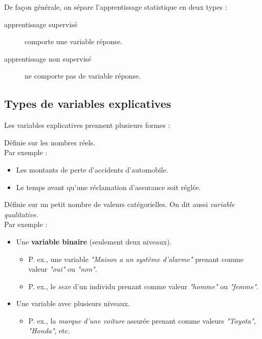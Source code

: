 \documentclass[10pt, french]{article}
\begin{document}
\begin{multicols*}{2}
De façon générale, on sépare l'apprentissage statistique en deux types :
\begin{description}
	\item[apprentissage supervisé]	comporte une variable réponse.
	\item[apprentissage non supervisé]	ne comporte pas de variable réponse.
\end{description}


\columnbreak
\subsection{Types de variables explicatives}
Les variables explicatives prennent plusieurs formes :

\begin{definitionNOHFILLpropos}
Définie sur les nombres réels.	\\

Par exemple :
\begin{itemize}
	\item	Les montants de perte d'accidents d'automobile.
	\item	Le temps avant qu'une réclamation d'assurance soit réglée.
\end{itemize}
\end{definitionNOHFILLpropos}

\begin{definitionNOHFILLpropos}
Définie sur un petit nombre de valeurs catégorielles. On dit aussi \textit{variable qualitative}.	\\

Par exemple : 
\begin{itemize}
	\item	Une \textbf{variable binaire} (seulement deux niveaux). 
		\begin{itemize}
		\item	P. ex., une variable \textit{"Maison a un système d'alarme"} prenant comme valeur \textit{"oui"} ou \textit{"non"}.
		\item	P. ex., le \textit{sexe} d'un individu prenant comme valeur \textit{"homme"} ou \textit{"femme"}.
		\end{itemize}
	\item	Une variable avec plusieurs niveaux.
		\begin{itemize}
		\item	P. ex., la \textit{marque d'une voiture} assurée prenant comme valeurs \textit{"Toyota"}, \textit{"Honda"}, etc.
		\end{itemize}
\end{itemize}


\end{definitionNOHFILLpropos}
\end{multicols*}
\end{document}
